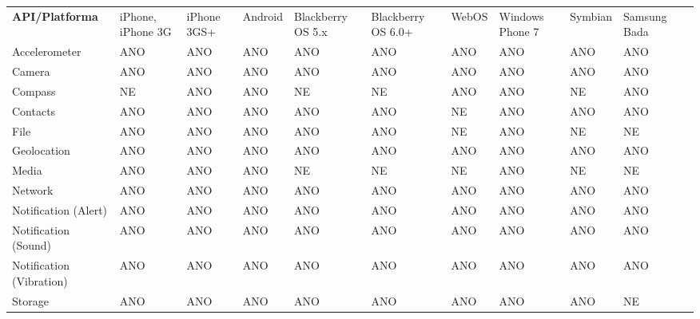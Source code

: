 \documentclass[thesis=B,czech]{FITthesis}[2012/06/26]
\begin{document}
\begin{landscape}
\begin{table}
\begin{tabularx}{21cm}{|p{4.3cm}|X|X|X|X|X|X|X|X|X|X|}
	\vspace{5 mm} \textbf{API/Platforma} & iPhone, iPhone 3G & iPhone 3GS+ & Android & Blac\-kberry OS 5.x & Black\-berry OS 6.0+ & WebOS & Windows Phone 7 & Symbian & Samsung Bada \\
	Accelerometer & ANO & ANO & ANO & ANO & ANO & ANO & ANO & ANO & ANO \\
	Camera & ANO & ANO & ANO & ANO & ANO & ANO & ANO & ANO & ANO \\
	Compass & NE & ANO & ANO & NE & NE & ANO & ANO & NE & ANO \\
	Contacts & ANO & ANO & ANO & ANO & ANO & NE & ANO & ANO & ANO \\
	File & ANO & ANO & ANO & ANO & ANO & NE & ANO & NE & NE \\
	Geolocation & ANO & ANO & ANO & ANO & ANO & ANO & ANO & ANO & ANO \\
	Media & ANO & ANO & ANO & NE & NE & NE & ANO & NE & NE \\
	Network & ANO & ANO & ANO & ANO & ANO & ANO & ANO & ANO & ANO \\
	Notification (Alert) & ANO & ANO & ANO & ANO & ANO & ANO & ANO & ANO & ANO \\
	Notification (Sound) & ANO & ANO & ANO & ANO & ANO & ANO & ANO & ANO & ANO \\
	Notification (Vibration) & ANO & ANO & ANO & ANO & ANO & ANO & ANO & ANO & ANO \\
	Storage & ANO & ANO & ANO & ANO & ANO & ANO & ANO & ANO & NE \\
    \hline
    \end{tabularx}
\end{table}
\end{landscape}
\end{document}
